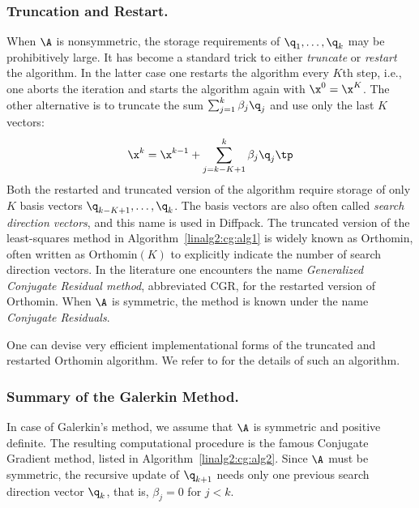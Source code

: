 \subsubsection{Truncation and Restart.}
When $\A$ is nonsymmetric, the storage requirements of $\q_1,\ldots,\q_k$
may be prohibitively large. It has become a standard trick to
either \emph{truncate} or \emph{restart} the algorithm.
In the latter case one restarts the algorithm every $K$th step, i.e.,
one aborts the iteration and starts the algorithm again with $\x^0=\x^K$.
The other alternative is to truncate the sum $\sum_{j=1}^k\beta_j\q_j$
and use only the last $K$ vectors:
\[ \x^k = \x^{k-1} + \sum_{j=k-K+1}^k \beta_j\q_j\tp \]
Both the restarted and truncated version of the algorithm require
storage of only $K$ basis vectors $\q_{k-K+1},\ldots,\q_k$.
The basis vectors are also often called \emph{search direction vectors},
 and this name is used in Diffpack.
The truncated version of the least-squares method in
Algorithm~\ref{linalg2:cg:alg1} is widely known as
Orthomin, often written as Orthomin$(K)$ to explicitly indicate the
number of search direction vectors.
In the literature one encounters the name
\emph{Generalized Conjugate Residual method}, abbreviated CGR, for
the restarted version of Orthomin. When $\A$ is symmetric, the method
is known under the name \emph{Conjugate Residuals}.

One can devise very efficient implementational forms of the
truncated and restarted Orthomin algorithm. We refer to
\cite{Lan90} for
the details of such an algorithm.

\subsubsection{Summary of the Galerkin Method.}
In case of Galerkin's method, we assume that $\A$ is symmetric and
positive definite. The resulting computational procedure
is the famous Conjugate Gradient
method, listed in Algorithm~\ref{linalg2:cg:alg2}.
Since $\A$ must be symmetric, the recursive update of
$\q_{k+1}$ needs only one previous search direction vector $\q_k$, that is,
$\beta_j=0$ for $j<k$.


